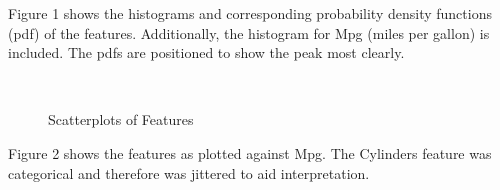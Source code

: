 \documentclass{homework}
\begin{document}
Figure 1 shows the histograms and corresponding probability density functions (pdf) of the features. Additionally, the histogram for Mpg (miles per gallon) is included. The pdfs are positioned to show the peak most clearly.
\question
\begin{figure}[H]
\centering
{}
\\
\caption{Scatterplots of Features}
\end{figure}
Figure 2 shows the features as plotted against Mpg. The Cylinders feature was categorical and therefore was jittered to aid interpretation.
\end{document}
